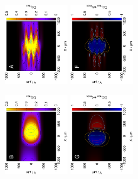 \newpage
\begin{figure}[H]
\centering
\includegraphics[trim = 20mm 30mm 0mm 20mm, clip, width=0.25\textwidth, angle=-90]{img/sim/meander_sim.eps} \includegraphics[trim = 20mm 30mm 0mm 20mm, clip, width=0.25\textwidth, angle=-90]{img/sim/meander_delta.eps}

\includegraphics[trim = 20mm 30mm 0mm 20mm, clip, width=0.25\textwidth, angle=-90]{img/sim/fastcomb_sim.eps} \includegraphics[trim = 20mm 30mm 0mm 20mm, clip, width=0.25\textwidth, angle=-90]{img/sim/fastcomb_delta.eps}


\end{figure}
